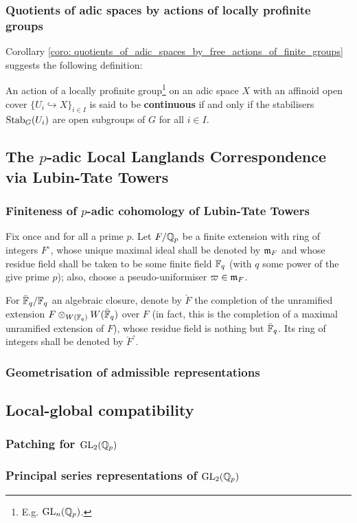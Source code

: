         \subsubsection{Quotients of adic spaces by actions of locally profinite groups}
            Corollary \ref{coro: quotients_of_adic_spaces_by_free_actions_of_finite_groups} suggests the following definition:
            \begin{definition}
                An action of a locally profinite group\footnote{E.g. $\operatorname{GL}_n(\mathbb{Q}_p)$.} on an adic space $X$ with an affinoid open cover $\{U_i \hookrightarrow X\}_{i \in I}$ is said to be \textbf{continuous} if and only if the stabilisers $\mathrm{Stab}_G(U_i)$ are open subgroups of $G$ for all $i \in I$.
            \end{definition}
    
    \subsection{The \texorpdfstring{$p$}{}-adic Local Langlands Correspondence via Lubin-Tate Towers}
        \subsubsection{Finiteness of \texorpdfstring{$p$}{}-adic cohomology of Lubin-Tate Towers}
            \begin{convention}
                Fix once and for all a prime $p$. Let $F/\mathbb{Q}_p$ be a finite extension with ring of integers $F^{\circ}$, whose unique maximal ideal shall be denoted by $\mathfrak{m}_F$ and whose residue field shall be taken to be some finite field $\mathbb{F}_q$ (with $q$ some power of the give prime $p$); also, choose a pseudo-uniformiser $\varpi \in \mathfrak{m}_F$.
                
                For $\bar{\mathbb{F}}_q/\mathbb{F}_q$ an algebraic closure, denote by $\breve{F}$ the completion of the unramified extension $F \tensor_{\Witt(\F_q)} \Witt(\bar{\F}_q)$ over $F$ (in fact, this is the completion of a maximal unramified extension of $F$), whose residue field is nothing but $\bar{\mathbb{F}}_q$. Its ring of integers shall be denoted by $\breve{F}^{\circ}$.
            \end{convention}
        
        \subsubsection{Geometrisation of admissible representations}
        
    \subsection{Local-global compatibility}
        \subsubsection{Patching for \texorpdfstring{$\operatorname{GL}_2(\mathbb{Q}_p)$}{}}
        
        \subsubsection{Principal series representations of \texorpdfstring{$\operatorname{GL}_2(\mathbb{Q}_p)$}{}}